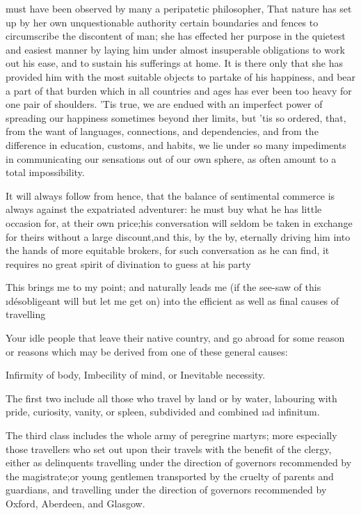 \documentclass[twoside]{article}
\begin{document}
 must have been observed by many a peripatetic philosopher, That nature
has set up by her own unquestionable authority certain boundaries and
fences to circumscribe the discontent of man; she has effected her
purpose in the quietest and easiest manner by laying him under almost
insuperable obligations to work out his ease, and to sustain his
sufferings at home.  It is there only that she has provided him with the
most suitable objects to partake of his happiness, and bear a part of
that burden which in all countries and ages has ever been too heavy for
one pair of shoulders.  ’Tis true, we are endued with an imperfect power
of spreading our happiness sometimes beyond \i{her} limits, but ’tis so
ordered, that, from the want of languages, connections, and dependencies,
and from the difference in education, customs, and habits, we lie under
so many impediments in communicating our sensations out of our own
sphere, as often amount to a total impossibility.

It will always follow from hence, that the balance of sentimental
commerce is always against the expatriated adventurer: he must buy what
he has little occasion for, at their own price;\tsk his conversation will
seldom be taken in exchange for theirs without a large discount,\tsk and
this, by the by, eternally driving him into the hands of more equitable
brokers, for such conversation as he can find, it requires no great
spirit of divination to guess at his party\tsk 

This brings me to my point; and naturally leads me (if the see-saw of
this \i{désobligeant} will but let me get on) into the efficient as well as
final causes of travelling\tsk 

Your idle people that leave their native country, and go abroad for some
reason or reasons which may be derived from one of these general causes:\tsk 

  Infirmity of body,
  Imbecility of mind, or
  Inevitable necessity.

The first two include all those who travel by land or by water, labouring
with pride, curiosity, vanity, or spleen, subdivided and combined \i{ad
infinitum}.

The third class includes the whole army of peregrine martyrs; more
especially those travellers who set out upon their travels with the
benefit of the clergy, either as delinquents travelling under the
direction of governors recommended by the magistrate;\tsk or young gentlemen
transported by the cruelty of parents and guardians, and travelling under
the direction of governors recommended by Oxford, Aberdeen, and Glasgow.
\end{document}
